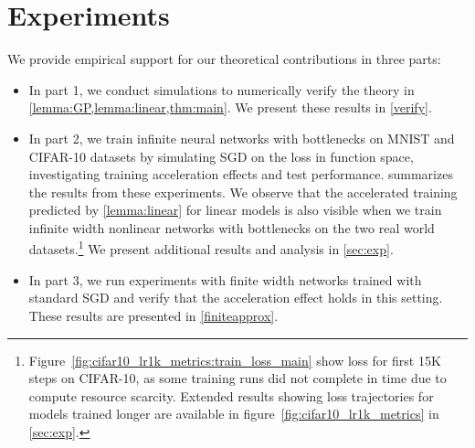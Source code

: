 \documentclass{article}
\theoremstyle{definition}
\theoremstyle{remark}
\renewcommand{\[}{\begin{eqnarray}}
\renewcommand{\]}{\end{eqnarray}}
\renewcommand{\[}{\begin{eqnarray}}
\renewcommand{\]}{\end{eqnarray}}
\begin{document}

\section{Experiments}

We provide empirical support for our theoretical contributions in three parts:
\begin{itemize}
    \item In part 1, we conduct simulations to numerically verify the theory in \cref{lemma:GP,lemma:linear,thm:main}. We present these results in \cref{verify}.
    \item  In part 2, we train infinite neural networks with bottlenecks on MNIST \cite{mnist} and CIFAR-10 \cite{cifar} datasets by simulating SGD on the loss in function space, investigating training acceleration effects and test performance.  summarizes the results from these experiments. We observe that the accelerated training predicted by  \cref{lemma:linear} for linear models is also visible when we train infinite width nonlinear networks with bottlenecks on the two real world datasets.\footnote{Figure~\ref{fig:cifar10_lr1k_metrics:train_loss_main} show loss for first 15K steps on CIFAR-10, as some training runs did not complete in time due to compute resource scarcity. Extended results showing loss trajectories for models trained longer are available in figure~\ref{fig:cifar10_lr1k_metrics} in \cref{sec:exp}.} We present additional results and analysis in \cref{sec:exp}.
    \item In part 3, we run experiments with finite width networks trained with standard SGD and verify that the acceleration effect holds in this setting. These results are presented in \cref{finiteapprox}.
\end{itemize}
\end{document}
